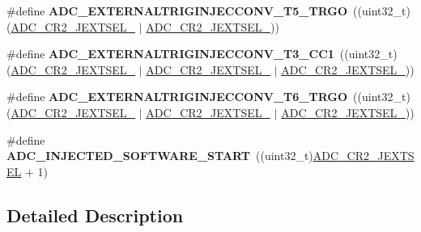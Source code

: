 \begin{DoxyCompactItemize}
\#define {\bfseries A\+D\+C\+\_\+\+E\+X\+T\+E\+R\+N\+A\+L\+T\+R\+I\+G\+I\+N\+J\+E\+C\+C\+O\+N\+V\+\_\+\+T5\+\_\+\+T\+R\+GO}~((uint32\+\_\+t)(\mbox{\hyperlink{group___peripheral___registers___bits___definition_gae34f5dda7a153ffd927c9cd38999f822}{A\+D\+C\+\_\+\+C\+R2\+\_\+\+J\+E\+X\+T\+S\+E\+L\+\_}} $\vert$ \mbox{\hyperlink{group___peripheral___registers___bits___definition_ga571bb97f950181fedbc0d4756482713d}{A\+D\+C\+\_\+\+C\+R2\+\_\+\+J\+E\+X\+T\+S\+E\+L\+\_}}))
\item 
\mbox{\label{group___a_d_c_ex___external__trigger___source___injected_ga67d6bbf4f3ce68a6711bdb952b93fed6}} 
\#define {\bfseries A\+D\+C\+\_\+\+E\+X\+T\+E\+R\+N\+A\+L\+T\+R\+I\+G\+I\+N\+J\+E\+C\+C\+O\+N\+V\+\_\+\+T3\+\_\+\+C\+C1}~((uint32\+\_\+t)(\mbox{\hyperlink{group___peripheral___registers___bits___definition_gae34f5dda7a153ffd927c9cd38999f822}{A\+D\+C\+\_\+\+C\+R2\+\_\+\+J\+E\+X\+T\+S\+E\+L\+\_}} $\vert$ \mbox{\hyperlink{group___peripheral___registers___bits___definition_ga571bb97f950181fedbc0d4756482713d}{A\+D\+C\+\_\+\+C\+R2\+\_\+\+J\+E\+X\+T\+S\+E\+L\+\_}} $\vert$ \mbox{\hyperlink{group___peripheral___registers___bits___definition_gaa70c1f30e2101e2177ce564440203ba3}{A\+D\+C\+\_\+\+C\+R2\+\_\+\+J\+E\+X\+T\+S\+E\+L\+\_}}))
\item 
\mbox{\label{group___a_d_c_ex___external__trigger___source___injected_ga026977601e311ef4c303de0b4ac39b46}} 
\#define {\bfseries A\+D\+C\+\_\+\+E\+X\+T\+E\+R\+N\+A\+L\+T\+R\+I\+G\+I\+N\+J\+E\+C\+C\+O\+N\+V\+\_\+\+T6\+\_\+\+T\+R\+GO}~((uint32\+\_\+t)(\mbox{\hyperlink{group___peripheral___registers___bits___definition_gae34f5dda7a153ffd927c9cd38999f822}{A\+D\+C\+\_\+\+C\+R2\+\_\+\+J\+E\+X\+T\+S\+E\+L\+\_}} $\vert$ \mbox{\hyperlink{group___peripheral___registers___bits___definition_ga571bb97f950181fedbc0d4756482713d}{A\+D\+C\+\_\+\+C\+R2\+\_\+\+J\+E\+X\+T\+S\+E\+L\+\_}} $\vert$ \mbox{\hyperlink{group___peripheral___registers___bits___definition_ga99fa4a240d34ce231d6d0543bac7fd9b}{A\+D\+C\+\_\+\+C\+R2\+\_\+\+J\+E\+X\+T\+S\+E\+L\+\_}}))
\item 
\mbox{\label{group___a_d_c_ex___external__trigger___source___injected_gae90a9b5e1ae0cb2ef2c711d90b0b382b}} 
\#define {\bfseries A\+D\+C\+\_\+\+I\+N\+J\+E\+C\+T\+E\+D\+\_\+\+S\+O\+F\+T\+W\+A\+R\+E\+\_\+\+S\+T\+A\+RT}~((uint32\+\_\+t)\mbox{\hyperlink{group___peripheral___registers___bits___definition_gaab3aa5d0e2a4b77960ec8f3b425a3eac}{A\+D\+C\+\_\+\+C\+R2\+\_\+\+J\+E\+X\+T\+S\+EL}} + 1)
\end{DoxyCompactItemize}


\subsection{Detailed Description}
